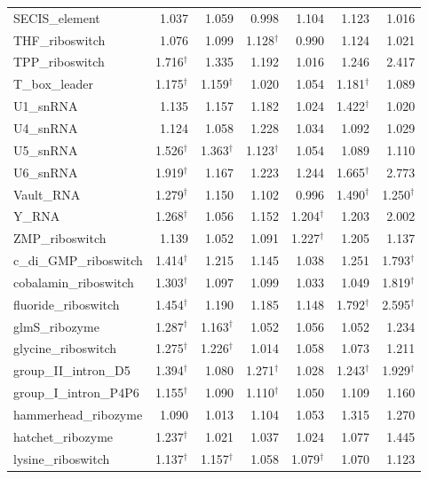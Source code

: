 \begin{longtable}{@{}lrrrrrr@{}}
SECIS\_element & 1.037 & 1.059 & 0.998 & 1.104 & 1.123 & 1.016 \\
THF\_riboswitch & 1.076 & 1.099 & 1.128$^\dagger$ & 0.990 & 1.124 & 1.021 \\
TPP\_riboswitch & 1.716$^\dagger$ & 1.335 & 1.192 & 1.016 & 1.246 & 2.417 \\
T\_box\_leader & 1.175$^\dagger$ & 1.159$^\dagger$ & 1.020 & 1.054 & 1.181$^\dagger$ & 1.089 \\
U1\_snRNA & 1.135 & 1.157 & 1.182 & 1.024 & 1.422$^\dagger$ & 1.020 \\
U4\_snRNA & 1.124 & 1.058 & 1.228 & 1.034 & 1.092 & 1.029 \\
U5\_snRNA & 1.526$^\dagger$ & 1.363$^\dagger$ & 1.123$^\dagger$ & 1.054 & 1.089 & 1.110 \\
U6\_snRNA & 1.919$^\dagger$ & 1.167 & 1.223 & 1.244 & 1.665$^\dagger$ & 2.773 \\
Vault\_RNA & 1.279$^\dagger$ & 1.150 & 1.102 & 0.996 & 1.490$^\dagger$ & 1.250$^\dagger$ \\
Y\_RNA & 1.268$^\dagger$ & 1.056 & 1.152 & 1.204$^\dagger$ & 1.203 & 2.002 \\
ZMP\_riboswitch & 1.139 & 1.052 & 1.091 & 1.227$^\dagger$ & 1.205 & 1.137 \\
c\_di\_GMP\_riboswitch & 1.414$^\dagger$ & 1.215 & 1.145 & 1.038 & 1.251 & 1.793$^\dagger$ \\
cobalamin\_riboswitch & 1.303$^\dagger$ & 1.097 & 1.099 & 1.033 & 1.049 & 1.819$^\dagger$ \\
fluoride\_riboswitch & 1.454$^\dagger$ & 1.190 & 1.185 & 1.148 & 1.792$^\dagger$ & 2.595$^\dagger$ \\
glmS\_ribozyme & 1.287$^\dagger$ & 1.163$^\dagger$ & 1.052 & 1.056 & 1.052 & 1.234 \\
glycine\_riboswitch & 1.275$^\dagger$ & 1.226$^\dagger$ & 1.014 & 1.058 & 1.073 & 1.211 \\
group\_II\_intron\_D5 & 1.394$^\dagger$ & 1.080 & 1.271$^\dagger$ & 1.028 & 1.243$^\dagger$ & 1.929$^\dagger$ \\
group\_I\_intron\_P4P6 & 1.155$^\dagger$ & 1.090 & 1.110$^\dagger$ & 1.050 & 1.109 & 1.160 \\
hammerhead\_ribozyme & 1.090 & 1.013 & 1.104 & 1.053 & 1.315 & 1.270 \\
hatchet\_ribozyme & 1.237$^\dagger$ & 1.021 & 1.037 & 1.024 & 1.077 & 1.445 \\
lysine\_riboswitch & 1.137$^\dagger$ & 1.157$^\dagger$ & 1.058 & 1.079$^\dagger$ & 1.070 & 1.123 \\

\end{longtable}
